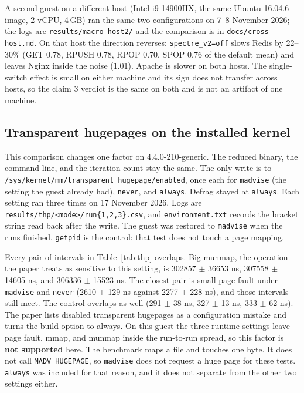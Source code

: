 \documentclass[11pt]{article}
\begin{document}
A second guest on a different host (Intel i9-14900HX, the same Ubuntu 16.04.6 image, 2 vCPU, 4\,GB) ran the same two configurations on 7--8 November 2026; the logs are \texttt{results/macro-host2/} and the comparison is in \texttt{docs/cross-host.md}. On that host the direction reverses: \texttt{spectre\_v2=off} slows Redis by 22--30\% (GET 0.78, RPUSH 0.78, RPOP 0.70, SPOP 0.76 of the default mean) and leaves Nginx inside the noise (1.01). Apache is slower on both hosts. The single-switch effect is small on either machine and its sign does not transfer across hosts, so the claim 3 verdict is the same on both and is not an artifact of one machine.

\subsection{Transparent hugepages on the installed kernel}

This comparison changes one factor on 4.4.0-210-generic. The reduced binary, the command line, and the iteration count stay the same. The only write is to \texttt{/sys/kernel/mm/transparent\_hugepage/enabled}, once each for \texttt{madvise} (the setting the guest already had), \texttt{never}, and \texttt{always}. Defrag stayed at \texttt{always}. Each setting ran three times on 17 November 2026. Logs are \texttt{results/thp/<mode>/run\{1,2,3\}.csv}, and \texttt{environment.txt} records the bracket string read back after the write. The guest was restored to \texttt{madvise} when the runs finished. \texttt{getpid} is the control: that test does not touch a page mapping.

\begin{table}[ht]
\centering
\caption{Transparent hugepages on one kernel. Each cell is the mean $\pm$ sample standard deviation of three K-best runs.}
\label{tab:thp}

\end{table}

Every pair of intervals in Table~\ref{tab:thp} overlaps. Big munmap, the operation the paper treats as sensitive to this setting, is 302857 $\pm$ 36653 ns, 307558 $\pm$ 14605 ns, and 306336 $\pm$ 15523 ns. The closest pair is small page fault under \texttt{madvise} and \texttt{never} (2610 $\pm$ 129 ns against 2277 $\pm$ 228 ns), and those intervals still meet. The control overlaps as well (291 $\pm$ 38 ns, 327 $\pm$ 13 ns, 333 $\pm$ 62 ns). The paper lists disabled transparent hugepages as a configuration mistake and turns the build option to always. On this guest the three runtime settings leave page fault, mmap, and munmap inside the run-to-run spread, so this factor is \textbf{not supported} here. The benchmark maps a file and touches one byte. It does not call \texttt{MADV\_HUGEPAGE}, so \texttt{madvise} does not request a huge page for these tests. \texttt{always} was included for that reason, and it does not separate from the other two settings either.
\end{document}
